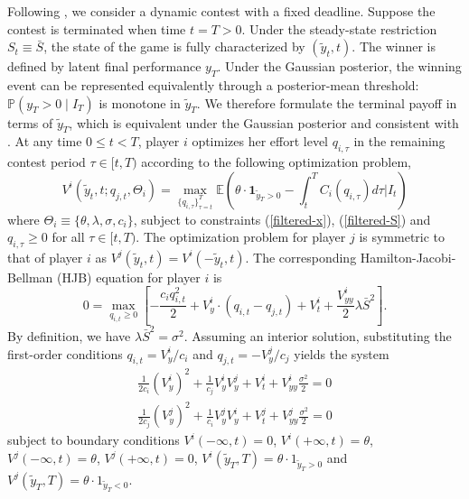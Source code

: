 \documentclass[mnsc]{informs3}
\begin{document}
Following \cite{Ryvkin2022Fight}, we consider a dynamic contest with a fixed deadline.
Suppose the contest is terminated when time $t=T>0$.
Under the steady-state restriction $S_t \equiv \bar S$, the state of the game is fully characterized by $(\tilde y_t,t)$.
The winner is defined by latent final performance $y_T$.
Under the Gaussian posterior, the winning event can be represented equivalently through a posterior-mean threshold: $\mathbb{P}(y_T>0\mid I_T)$ is monotone in $\tilde y_T$.
We therefore formulate the terminal payoff in terms of $\tilde y_T$, which is equivalent under the Gaussian posterior and consistent with \citet{Ryvkin2022Fight}.
At any time $0\le t<T$, player $i$ optimizes her effort level $q_{i,\tau}$ in the remaining contest period $\tau\in[t, T)$ according to the following optimization problem,
\begin{equation}\label{v-def}
	V^i(\tilde{y}_{t}, t ; q_{j,t},\Theta_i) = \max_{\{q_{i,\tau}\}^T_{\tau=t}}
\mathbb{E}\left( \theta\cdot\mathbf{1}_{\tilde{y}_T>0} - \int^T_tC_i(q_{i,\tau})d\tau \bigg|I_t\right)
\end{equation}
where $\Theta_i \equiv\{\theta, \lambda, \sigma, c_i\}$, subject to constraints (\ref{filtered-x}), (\ref{filtered-S}) and $q_{i,\tau}\ge0$ for all $\tau\in[t,T)$.
The optimization problem for player $j$ is symmetric to that of player $i$ as $V^j(\tilde{y}_t, t) = V^i(-\tilde{y}_t, t)$.
The corresponding Hamilton-Jacobi-Bellman (HJB) equation for player $i$ is
\begin{equation*}
0 = \max_{q_{i,t}\ge0}\left[-\frac{c_iq_{i,t}^2}{2} + V^i_{y}\cdot\left(q_{i,t}-q_{j,t}\right)+V^i_t + \frac{V^i_{yy}}{2}\lambda \bar{S}^2\right].
\end{equation*}
By definition, we have $\lambda \bar{S}^2 = \sigma^2$.
Assuming an interior solution, substituting the first-order conditions $q_{i,t} = V^i_y/c_i$ and $q_{j,t} = -V^j_y/c_j$ yields the system
\begin{equation*}
\begin{aligned}
\frac{1}{2c_i}(V^i_y)^2 + \frac{1}{c_j}V^i_yV^j_y + V^i_t + V^i_{yy}\frac{\sigma^2}{2} = 0\\
\frac{1}{2c_j}(V^j_y)^2 + \frac{1}{c_i}V^j_yV^i_y + V^j_t + V^j_{yy}\frac{\sigma^2}{2} = 0
\end{aligned}
\end{equation*}
subject to boundary conditions $V^i(-\infty, t) = 0$, $V^i(+\infty, t) = \theta$, $V^j(-\infty, t) = \theta$, $V^j(+\infty, t)=0$, $V^i(\tilde{y}_T, T) = \theta \cdot 1_{\tilde{y}_T > 0}$ and $V^j(\tilde{y}_T, T) = \theta \cdot 1_{\tilde{y}_T < 0}$.
\end{document}
